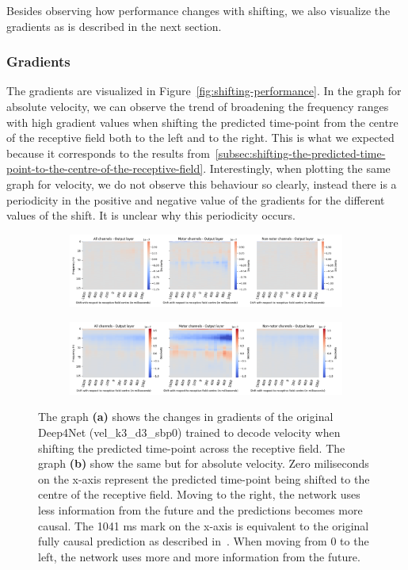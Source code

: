 Besides observing how performance changes with shifting, we also visualize the gradients as is described in the next section.

\subsubsection{Gradients}\label{subsubsec:across-shiftig-gradients}
The gradients are visualized in Figure~\ref{fig:shifting-performance}.
In the graph for absolute velocity, we can observe the trend of broadening the frequency ranges with high gradient values when shifting the predicted time-point from the centre of the receptive field both to the left and to the right.
This is what we expected because it corresponds to the results from~\cref{subsec:shifting-the-predicted-time-point-to-the-centre-of-the-receptive-field}.
Interestingly, when plotting the same graph for velocity, we do not observe this behaviour so clearly, instead there is a periodicity in the positive and negative value of the gradients for the different values of the shift.
It is unclear why this periodicity occurs.


\begin{figure}[!hpbp]
\begin{subfigure}[a]{\textwidth}
   \includegraphics[width=1\linewidth]{img/ch4/vel-shifted-gradients}
   \caption{}
\end{subfigure}\label{fig:vel-shifting-gradients}

\begin{subfigure}[b]{\textwidth}
   \includegraphics[width=1\linewidth]{img/ch4/absVel-shifted-gradients}
   \caption{}
\end{subfigure}\label{fig:absVel-shiftig-gradients}
\caption[]{The graph \textbf{(a)} shows the changes in gradients of the original Deep4Net (vel\_k3\_d3\_sbp0) trained to decode velocity when shifting the predicted time-point across the receptive field.
The graph \textbf{(b)} show the same but for absolute velocity. Zero miliseconds on the x-axis represent the predicted time-point being shifted to the centre of the receptive field.
Moving to the right, the network uses less information from the future and the predictions becomes more causal.
The 1041 ms mark on the x-axis is equivalent to the original fully causal prediction as described in~\cite{Hammer-2021}.
When moving from 0 to the left, the network uses more and more information from the future.}
\end{figure}\label{fig:shifting-gradients}

